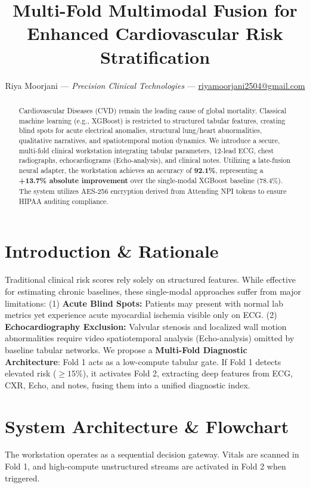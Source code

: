 \documentclass[10pt]{article}
\begin{document}
\title{\large \textbf{Multi-Fold Multimodal Fusion for Enhanced Cardiovascular Risk Stratification}}
\author{Riya Moorjani --- \textit{Precision Clinical Technologies} --- \href{mailto:riyamoorjani2504@gmail.com}{riyamoorjani2504@gmail.com}}
\date{}
\maketitle
\thispagestyle{empty}
\pagestyle{empty}

\begin{abstract}
Cardiovascular Diseases (CVD) remain the leading cause of global mortality. Classical machine learning (e.g., XGBoost) is restricted to structured tabular features, creating blind spots for acute electrical anomalies, structural lung/heart abnormalities, qualitative narratives, and spatiotemporal motion dynamics. We introduce a secure, multi-fold clinical workstation integrating tabular parameters, 12-lead ECG, chest radiographs, echocardiograms (Echo-analysis), and clinical notes. Utilizing a late-fusion neural adapter, the workstation achieves an accuracy of \textbf{92.1\%}, representing a \textbf{+13.7\% absolute improvement} over the single-modal XGBoost baseline (78.4\%). The system utilizes AES-256 encryption derived from Attending NPI tokens to ensure HIPAA auditing compliance.
\end{abstract}

\section{Introduction \& Rationale}
Traditional clinical risk scores rely solely on structured features. While effective for estimating chronic baselines, these single-modal approaches suffer from major limitations: (1) \textbf{Acute Blind Spots:} Patients may present with normal lab metrics yet experience acute myocardial ischemia visible only on ECG. (2) \textbf{Echocardiography Exclusion:} Valvular stenosis and localized wall motion abnormalities require video spatiotemporal analysis (Echo-analysis) omitted by baseline tabular networks. We propose a \textbf{Multi-Fold Diagnostic Architecture}: Fold 1 acts as a low-compute tabular gate. If Fold 1 detects elevated risk ($\ge 15\%$), it activates Fold 2, extracting deep features from ECG, CXR, Echo, and notes, fusing them into a unified diagnostic index.

\section{System Architecture \& Flowchart}
The workstation operates as a sequential decision gateway. Vitals are scanned in Fold 1, and high-compute unstructured streams are activated in Fold 2 when triggered.
\end{document}
